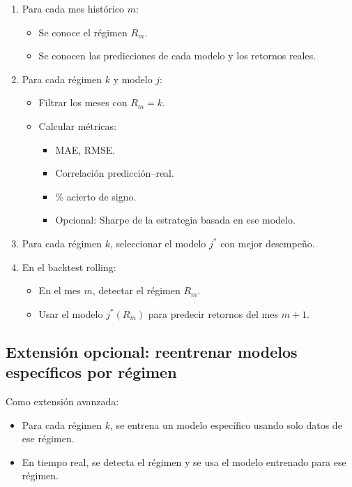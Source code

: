 \documentclass[12pt]{article}
\begin{document}
\begin{enumerate}
    \item Para cada mes histórico $m$:
    \begin{itemize}
        \item Se conoce el régimen $R_m$.
        \item Se conocen las predicciones de cada modelo y los retornos reales.
    \end{itemize}
    \item Para cada régimen $k$ y modelo $j$:
    \begin{itemize}
        \item Filtrar los meses con $R_m = k$.
        \item Calcular métricas:
        \begin{itemize}
            \item MAE, RMSE.
            \item Correlación predicción--real.
            \item \% acierto de signo.
            \item Opcional: Sharpe de la estrategia basada en ese modelo.
        \end{itemize}
    \end{itemize}
    \item Para cada régimen $k$, seleccionar el modelo $j^\ast$ con mejor desempeño.
    \item En el backtest rolling:
    \begin{itemize}
        \item En el mes $m$, detectar el régimen $R_m$.
        \item Usar el modelo $j^\ast(R_m)$ para predecir retornos del mes $m+1$.
    \end{itemize}
\end{enumerate}

\subsection{Extensión opcional: reentrenar modelos específicos por régimen}

Como extensión avanzada:

\begin{itemize}
    \item Para cada régimen $k$, se entrena un modelo específico usando solo datos de ese régimen.
    \item En tiempo real, se detecta el régimen y se usa el modelo entrenado para ese régimen.
\end{itemize}
\end{document}
